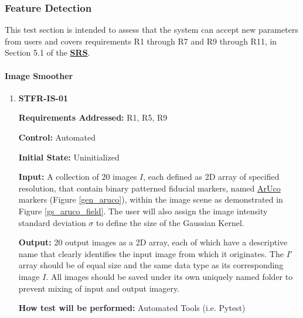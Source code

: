 \documentclass[12pt, titlepage]{article}
\begin{document}
\subsubsection{Feature Detection}
This test section is intended to assess that the system can accept new parameters from users and covers 
requirements R1 through R7 and R9 through R11, in Section 5.1 of the 
\textbf{\href{https://github.com/KiranSingh15/CAS-741-Image-Correspondences/blob/main/docs/SRS/SRS.pdf}
{SRS}}. 
		
\paragraph{Image Smoother}
\begin{enumerate}
\item \hypertarget{STFR-IS-01}{\textbf{STFR-IS-01}}

\textbf{Requirements Addressed:} R1, R5, R9

\textbf{Control:} Automated		

\textbf{Initial State:} Uninitialized

\textbf{Input:} A collection of 20 images $I$, each defined as 2D array of specified resolution, that contain 
binary patterned fiducial markers, named 
\href{https://docs.opencv.org/4.x/d5/dae/tutorial_aruco_detection.html}
{ArUco} markers (Figure \ref{gen_aruco}), within the image scene as demonstrated 
in Figure \ref{gs_aruco_field}. The user will also assign the image intensity standard deviation $\sigma$ 
to define the size of the Gaussian Kernel.

\textbf{Output:} 20 output images as a 2D array, each of which have a descriptive name that clearly identifies the 
input image from which it originates. The $I'$ array should be of equal size and the same data type as its 
corresponding image $I$. All images should be saved under its own uniquely named folder to prevent mixing 
of input and output imagery.

\textbf{How test will be performed:} Automated Tools (i.e. Pytest)

\end{enumerate}
\end{document}
